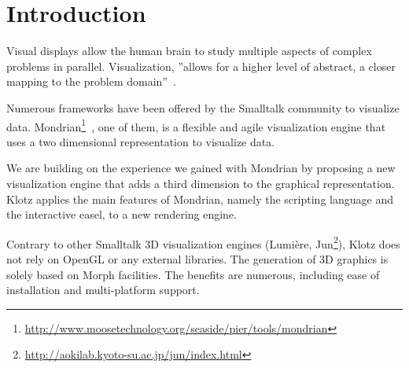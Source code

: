 \documentclass{sig-alternate}
\newcommand{\rj}[1]{\nb{Ricardo}{green}{#1}}
\newcommand{\seclabel}[1]{\label{sec:#1}}
\newcommand{\figlabel}[1]{\label{fig:#1}}
\begin{document}




\section{Introduction} \seclabel{introduction}

Visual displays allow the human brain to study multiple aspects of complex problems in parallel. Visualization, ''allows for a higher level of abstract, a closer mapping to the problem domain''~\cite{Petr95a}. 

Numerous frameworks have been offered by the Smalltalk community to visualize data. Mondrian\footnote{\url{http://www.moosetechnology.org/seaside/pier/tools/mondrian}}~\cite{Meye06a}, one of them, is a flexible and agile visualization engine that uses a two dimensional representation to visualize data.  

We are building on the experience we gained with Mondrian by proposing a new visualization engine that adds a third dimension to the graphical representation. Klotz applies the main features of Mondrian, namely the scripting language and the interactive easel, to a new rendering engine.

Contrary to other Smalltalk 3D visualization engines (Lumi\`ere\cite{Oliv09a}, Jun\footnote{\url{http://aokilab.kyoto-su.ac.jp/jun/index.html}}), Klotz does not rely on OpenGL or any external libraries. The generation of 3D graphics is solely based on Morph facilities. The benefits are numerous, including ease of installation and multi-platform support.
\end{document}
